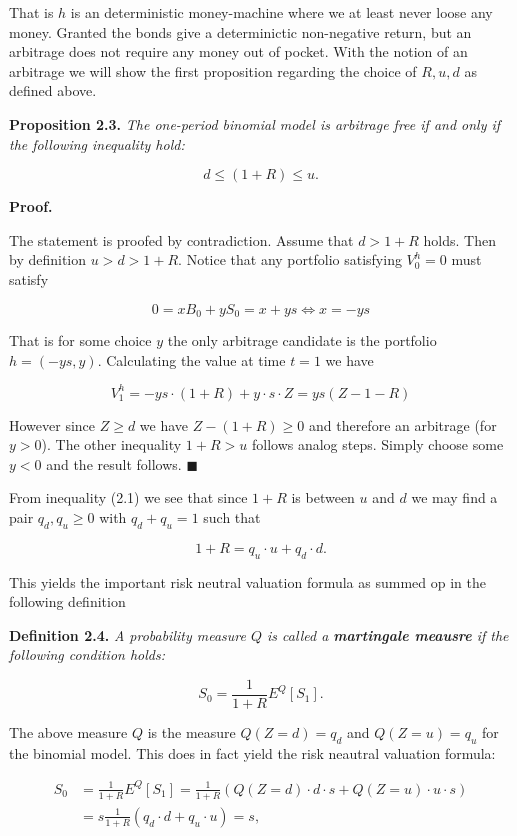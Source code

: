 \documentclass[
]{article}
\begin{document}
That is \(h\) is an deterministic money-machine where we at least never
loose any money. Granted the bonds give a determinictic non-negative
return, but an arbitrage does not require any money out of pocket. With
the notion of an arbitrage we will show the first proposition regarding
the choice of \(R,u,d\) as defined above.

\textbf{Proposition 2.3.} \emph{The one-period binomial model is
arbitrage free if and only if the following inequality hold:}

\[d\le (1+R)\le u.\tag{2.1}\]

\textbf{Proof.}

The statement is proofed by contradiction. Assume that \(d>1+R\) holds.
Then by definition \(u>d>1+R\). Notice that any portfolio satisfying
\(V_0^h=0\) must satisfy

\[0=xB_0+yS_0=x+ys\iff x=-ys\]

That is for some choice \(y\) the only arbitrage candidate is the
portfolio \(h=(-ys,y)\). Calculating the value at time \(t=1\) we have

\[V_1^h=-ys\cdot(1+R)+y\cdot s\cdot Z=ys(Z-1-R)\]

However since \(Z\ge d\) we have \(Z-(1+R)\ge 0\) and therefore an
arbitrage (for \(y>0\)). The other inequality \(1+R>u\) follows analog
steps. Simply choose some \(y<0\) and the result follows.
\(\blacksquare\)

From inequality (2.1) we see that since \(1+R\) is between \(u\) and
\(d\) we may find a pair \(q_d,q_u\ge 0\) with \(q_d+q_u=1\) such that

\[1+R=q_u\cdot u+q_d\cdot d.\]

This yields the important risk neutral valuation formula as summed op in
the following definition

\textbf{Definition 2.4.} \emph{A probability measure \(Q\) is called a
\textbf{martingale meausre} if the following condition holds:}

\[S_0=\frac{1}{1+R}E^Q[S_1].\]

The above measure \(Q\) is the measure \(Q(Z=d)=q_d\) and \(Q(Z=u)=q_u\)
for the binomial model. This does in fact yield the risk neautral
valuation formula:

\begin{align*}
S_0&=\frac{1}{1+R}E^Q[S_1]=\frac{1}{1+R}(Q(Z=d)\cdot d\cdot s+Q(Z=u)\cdot u\cdot s)\\
&=s\frac{1}{1+R}(q_d\cdot d+q_u\cdot u)=s,
\end{align*}
\end{document}
